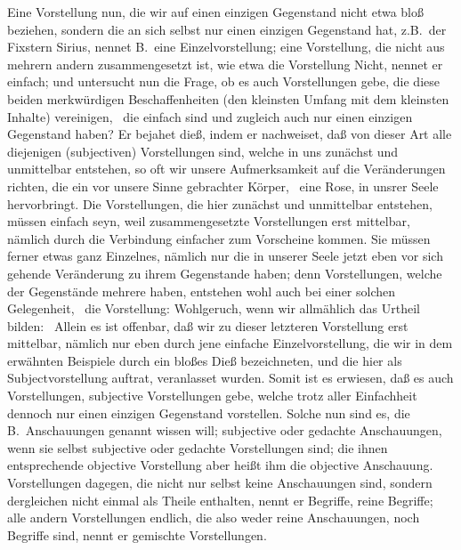 Eine Vorstellung nun, die wir auf einen einzigen Gegenstand nicht etwa bloß beziehen, sondern die an sich selbst nur einen einzigen Gegenstand hat, z.B.\ der Fixstern Sirius, nennet B.\ eine Einzelvorstellung; eine Vorstellung, die nicht aus mehrern andern zusammengesetzt ist, wie etwa die Vorstellung Nicht, nennet er einfach; und untersucht nun die Frage, ob es auch Vorstellungen gebe, die diese beiden merkwürdigen Beschaffenheiten (den kleinsten Umfang mit dem kleinsten Inhalte) vereinigen, \dh\  die einfach sind und zugleich auch nur einen einzigen Gegenstand haben? Er bejahet dieß, indem er nachweiset, daß von dieser Art alle diejenigen (subjectiven) Vorstellungen sind, welche in uns zunächst und unmittelbar entstehen, so oft wir unsere Aufmerksamkeit auf die Veränderungen richten, die ein vor unsere Sinne gebrachter Körper, \zB\ eine Rose, in unsrer Seele hervorbringt. Die Vorstellungen, die hier zunächst und unmittelbar entstehen, müssen einfach seyn, weil zusammengesetzte Vorstellungen erst mittelbar, nämlich durch die Verbindung einfacher zum Vorscheine kommen. Sie müssen ferner etwas ganz Einzelnes, nämlich nur die in unserer Seele jetzt eben vor sich gehende Veränderung zu ihrem Gegenstande haben; denn Vorstellungen, welche der Gegenstände mehrere haben, entstehen wohl auch bei einer solchen Gelegenheit, \zB\ die Vorstellung: Wohlgeruch, wenn wir allmählich das Urtheil bilden:  \udgl\  Allein es ist offenbar, daß wir zu dieser letzteren Vorstellung erst mittelbar, nämlich nur eben durch jene einfache Einzelvorstellung, die wir in dem erwähnten Beispiele durch ein bloßes Dieß bezeichneten, und die hier als Subjectvorstellung auftrat, veranlasset wurden. Somit  ist es erwiesen, daß es auch Vorstellungen, subjective Vorstellungen gebe, welche trotz aller Einfachheit dennoch nur einen einzigen Gegenstand vorstellen. Solche nun sind es, die B.\ Anschauungen genannt wissen will; subjective oder gedachte Anschauungen, wenn sie selbst subjective oder gedachte Vorstellungen sind; die ihnen entsprechende objective Vorstellung aber heißt ihm die objective Anschauung. Vorstellungen dagegen, die nicht nur selbst keine Anschauungen sind, sondern dergleichen nicht einmal als Theile enthalten, nennt er Begriffe, reine Begriffe; alle andern Vorstellungen endlich, die also weder reine Anschauungen, noch Begriffe sind, nennt er gemischte Vorstellungen. \par
